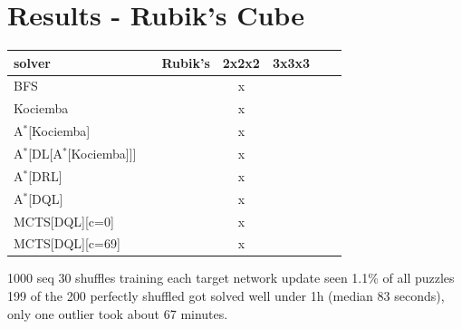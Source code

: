 
\chapter{Results - Rubik's Cube} %

\label{sec:ResRubiks} %






\begin{center}
\begin{tabular}{l*{5}{c}r}
\hline
\textbf{solver}      & & \textbf{Rubik's} & \textbf{2x2x2} & \textbf{3x3x3} \\
\hline
BFS   &   &        & x   &   \\
\hline
Kociemba   &   &      & x  &   \\
\hline
A$^{*}$[Kociemba]  &   &  & x & \\
\hline
A$^{*}$[DL[A$^{*}$[Kociemba]]]  &   &  & x & \\
\hline
A$^{*}$[DRL]  &   &  & x &  \\
\hline
A$^{*}$[DQL]  &   &  & x &  \\
\hline
MCTS[DQL][c=0]  &   &  & x &  \\
\hline
MCTS[DQL][c=69]  &   & & x &  \\
\hline
\end{tabular}
\end{center}









1000 seq 30 shuffles training each target network update seen 1.1\% of all puzzles
199 of the 200 perfectly shuffled got solved well under 1h (median 83 seconds), only one outlier took about 67 minutes.


